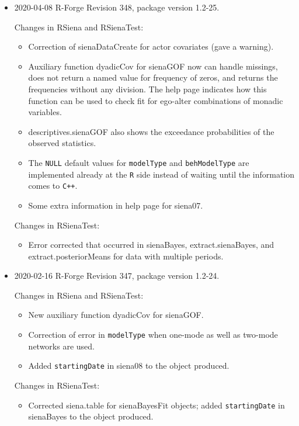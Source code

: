 \documentclass[a4paper,fleqn,11pt]{article}
\newcommand{\+}{\, + \,}
\newcommand{\sfn}[1]{\textsf{#1}}
\begin{document}
\begin{small}
\begin{itemize}
\item 2020-04-08 R-Forge Revision 348, package version 1.2-25.

Changes in RSiena and RSienaTest:
\begin{itemize}
 \item Correction of \sfn{sienaDataCreate} for actor covariates (gave a warning).
 \item Auxiliary function \sfn{dyadicCov} for \sfn{sienaGOF} now can handle missings,
     does not return a named value for frequency of zeros,
     and returns the frequencies without any division.
     The help page indicates how this function can be used to check fit
     for ego-alter combinations of monadic variables.
 \item \sfn{descriptives.sienaGOF} also shows the exceedance probabilities
     of the observed statistics.
 \item The \texttt{NULL} default values for \texttt{modelType}
     and \texttt{behModelType} are implemented already at the \texttt{R}
     side instead of waiting until the information comes to \texttt{C++}.
 \item Some extra information in help page for \sfn{siena07}.
\end{itemize}

Changes in RSienaTest:
\begin{itemize}
 \item Error corrected that occurred in \sfn{sienaBayes}, \sfn{extract.sienaBayes},
 and \sfn{extract.posteriorMeans} for data with multiple periods.
\end{itemize}


\item 2020-02-16 R-Forge Revision 347, package version 1.2-24.

Changes in RSiena and RSienaTest:
\begin{itemize}
\item New auxiliary function \sfn{dyadicCov} for \sfn{sienaGOF}.
\item Correction of error in \texttt{modelType} when one-mode as well as two-mode
     networks are used.
\item Added \texttt{startingDate} in \sfn{siena08} to the object produced.
\end{itemize}

Changes in RSienaTest:
\begin{itemize}
   \item Corrected \sfn{siena.table} for \sfn{sienaBayesFit} objects;
     added \texttt{startingDate} in \sfn{sienaBayes} to the object produced.
\end{itemize}



\end{itemize}
\end{small}
\end{document}
